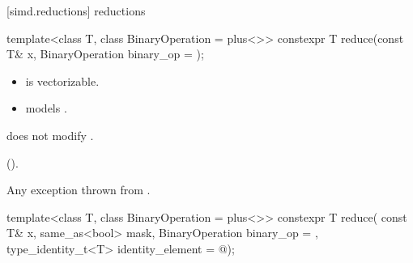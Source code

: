[simd.reductions]{ reductions}

\begin{itemdecl}
template<class T, class BinaryOperation = plus<>>
  constexpr T reduce(const T& x, BinaryOperation binary_op = {});
\end{itemdecl}

\begin{itemdescr}
  \pnum\constraints
  \begin{itemize}
    \item {} is vectorizable.

    \item {} models .
  \end{itemize}
  \pnum\expects
   does not modify .

  \pnum\returns
  ().

  \pnum\throws
  Any exception thrown from .
\end{itemdescr}

\begin{itemdecl}
template<class T, class BinaryOperation = plus<>>
  constexpr T reduce(
    const T& x, same_as<bool> mask,
    BinaryOperation binary_op = {}, type_identity_t<T> identity_element = @\seebelow@);
\end{itemdecl}

